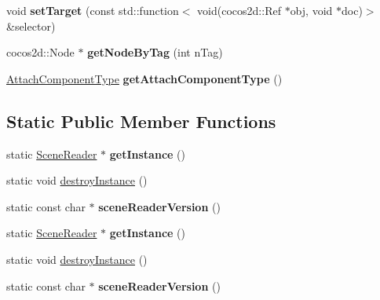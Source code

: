 \begin{DoxyCompactItemize}
void {\bfseries set\+Target} (const std\+::function$<$ void(cocos2d\+::\+Ref $\ast$obj, void $\ast$doc)$>$ \&selector)
\item 
\mbox{\label{classcocostudio_1_1SceneReader_a3a17386a016856ea52ca7006bf725881}} 
cocos2d\+::\+Node $\ast$ {\bfseries get\+Node\+By\+Tag} (int n\+Tag)
\item 
\mbox{\label{classcocostudio_1_1SceneReader_a6f19ab8407b0d3b3edbd57c30600f93d}} 
\hyperlink{classcocostudio_1_1SceneReader_ae79446a46e4d2fecfe754382fc2ec24a}{Attach\+Component\+Type} {\bfseries get\+Attach\+Component\+Type} ()
\end{DoxyCompactItemize}
\subsection*{Static Public Member Functions}
\begin{DoxyCompactItemize}
\item 
\mbox{\label{classcocostudio_1_1SceneReader_a773b0e047c80b2f93fe624221038243a}} 
static \hyperlink{classcocostudio_1_1SceneReader}{Scene\+Reader} $\ast$ {\bfseries get\+Instance} ()
\item 
static void \hyperlink{classcocostudio_1_1SceneReader_ae4423389d03d90eb0042e0e419274f79}{destroy\+Instance} ()
\item 
\mbox{\label{classcocostudio_1_1SceneReader_a716231300751beae9cc21ed45b9aa825}} 
static const char $\ast$ {\bfseries scene\+Reader\+Version} ()
\item 
\mbox{\label{classcocostudio_1_1SceneReader_afe9de60ddcb844d8315f711495c8f0c6}} 
static \hyperlink{classcocostudio_1_1SceneReader}{Scene\+Reader} $\ast$ {\bfseries get\+Instance} ()
\item 
static void \hyperlink{classcocostudio_1_1SceneReader_ade5aa96936540c45b1ceeba0b9847fc5}{destroy\+Instance} ()
\item 
\mbox{\label{classcocostudio_1_1SceneReader_ab8fb7d6c5cbf123ed447d376303d70d6}} 
static const char $\ast$ {\bfseries scene\+Reader\+Version} ()
\end{DoxyCompactItemize}
